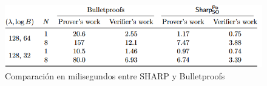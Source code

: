 \begin{figure}[H]
    \centering
    \includegraphics[width=\textwidth]{images/sharp vs bulletproof.png}
    \caption{Comparación en milisegundos entre SHARP y Bulletproofs \cite{Sharp}}
\end{figure}

